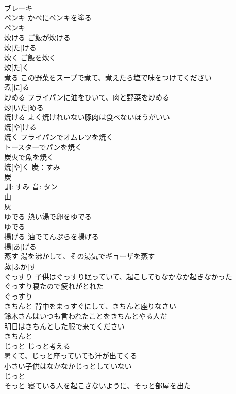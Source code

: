 \documentclass[8pt]{extreport}
\begin{document}
\begin{CJK}{UTF8}{min}
\\	ブレーキ						
\\	ペンキ	かべにペンキを塗る 
\\	ペンキ			
\\	炊ける	ご飯が炊ける 
\\	炊[た]ける						
\\	炊く	ご飯を炊く 
\\	炊[た]く						
\\	煮る	この野菜をスープで煮て、煮えたら塩で味をつけてください 
\\	煮[に]る						
\\	炒める	フライパンに油をひいて、肉と野菜を炒める 
\\	炒[いた]める			
\\	焼ける	よく焼けれいない豚肉は食べないほうがいい 
\\	焼[や]ける						
\\	焼く	フライパンでオムレツを焼く 
\\	トースターでパンを焼く 
\\	炭火で魚を焼く 
\\	焼[や]く			炭：すみ
\\	炭 
\\	訓: すみ 音: タン 
\\	山 
\\	灰 
\\	ゆでる	熱い湯で卵をゆでる 
\\	ゆでる						
\\	揚げる	油でてんぷらを揚げる 
\\	揚[あ]げる						
\\	蒸す	湯を沸かして、その湯気でギョーザを蒸す 
\\	蒸[ふか]す						
\\	ぐっすり	子供はぐっすり眠っていて、起こしてもなかなか起きなかった 
\\	ぐっすり寝たので疲れがとれた 
\\	ぐっすり			
\\	きちんと	背中をまっすぐにして、きちんと座りなさい 
\\	鈴木さんはいつも言われたことをきちんとやる人だ 
\\	明日はきちんとした服で来てください 
\\	きちんと			
\\	じっと	じっと考える 
\\	暑くて、じっと座っていても汗が出てくる 
\\	小さい子供はなかなかじっとしていない 
\\	じっと		
\\	そっと	寝ている人を起こさないように、そっと部屋を出た 

\end{CJK}
\end{document}
